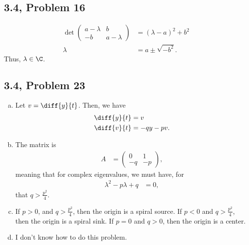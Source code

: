 \documentclass[10pt]{mypackage}
\begin{document}
\subsection{3.4, Problem 16}%
\begin{align*}
  \det \begin{pmatrix}a-\lambda & b \\ -b & a-\lambda\end{pmatrix} &= \left(\lambda - a\right)^2 + b^2\\
  \lambda &= a \pm \sqrt{-b^2}.
\end{align*}
Thus, $\lambda\in \C$.
\subsection{3.4, Problem 23}%
\begin{enumerate}[(a)]
  \item Let $v = \diff{y}{t}$. Then, we have
    \begin{align*}
      \diff{y}{t} &= v\\
      \diff{v}{t} &= -qy-pv.
    \end{align*}
  \item The matrix is
    \begin{align*}
      A &= \begin{pmatrix}0 & 1 \\ -q & -p\end{pmatrix},
    \end{align*}
    meaning that for complex eigenvalues, we must have, for
    \begin{align*}
      \lambda^2 - p\lambda + q &= 0,
    \end{align*}
    that $q > \frac{p^2}{4}$.
  \item If $p > 0$, and $q  > \frac{p^2}{4}$, then the origin is a spiral source. If $p < 0$ and $q > \frac{p^2}{4}$, then the origin is a spiral sink. If $p = 0$ and $q > 0$, then the origin is a center.
  \item I don't know how to do this problem.
\end{enumerate}
\end{document}
